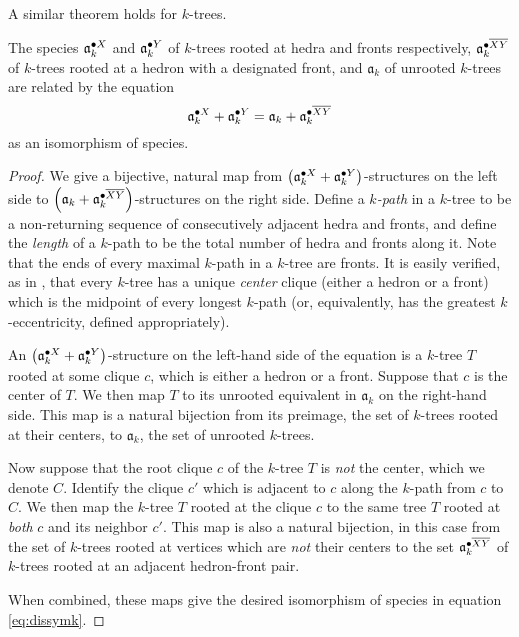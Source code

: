 \documentclass[sectionflow,singlespace,twoside,boldmathhdr,draft]{brandiss} %
\numberwithin{section}{chapter}
\numberwithin{figure}{chapter}
\begin{document}
A similar theorem holds for $k$-trees.
\begin{theorem}
  \label{thm:dissymk}
  The species $\pointed[X]{\mathfrak{a}}_{k}$ and $\pointed[Y]{\mathfrak{a}}_{k}$ of $k$-trees rooted at hedra and fronts respectively, $\pointed[\overline{XY}]{\mathfrak{a}}_{k}$ of $k$-trees rooted at a hedron with a designated front, and $\mathfrak{a}_{k}$ of unrooted $k$-trees are related by the equation
  \begin{equation}
    \label{eq:dissymk}
    \pointed[X]{\mathfrak{a}}_{k} + \pointed[Y]{\mathfrak{a}}_{k} = \mathfrak{a}_{k} + \pointed[\overline{XY}]{\mathfrak{a}}_{k}
  \end{equation}
  as an isomorphism of species.
\end{theorem}

\begin{proof}
  We give a bijective, natural map from $\pbrac{\pointed[X]{\mathfrak{a}}_{k} + \pointed[Y]{\mathfrak{a}}_{k}}$-structures on the left side to $\pbrac{\mathfrak{a}_{k} + \pointed[\overline{XY}]{\mathfrak{a}}_{k}}$-structures on the right side.
  Define a \emph{$k$-path} in a $k$-tree to be a non-returning sequence of consecutively adjacent hedra and fronts, and define the \emph{length} of a $k$-path to be the total number of hedra and fronts along it.
  Note that the ends of every maximal $k$-path in a $k$-tree are fronts.
  It is easily verified, as in \cite{kob:ktlogspace}, that every $k$-tree has a unique \emph{center} clique (either a hedron or a front) which is the midpoint of every longest $k$-path (or, equivalently, has the greatest $k$-eccentricity, defined appropriately).
  
  An $\pbrac{\pointed[X]{\mathfrak{a}}_{k} + \pointed[Y]{\mathfrak{a}}_{k}}$-structure on the left-hand side of the equation is a $k$-tree $T$ rooted at some clique $c$, which is either a hedron or a front.
  Suppose that $c$ is the center of $T$.
  We then map $T$ to its unrooted equivalent in $\mathfrak{a}_{k}$ on the right-hand side.
  This map is a natural bijection from its preimage, the set of $k$-trees rooted at their centers, to $\mathfrak{a}_{k}$, the set of unrooted $k$-trees.

  Now suppose that the root clique $c$ of the $k$-tree $T$ is \emph{not} the center, which we denote $C$.
  Identify the clique $c'$ which is adjacent to $c$ along the $k$-path from $c$ to $C$.
  We then map the $k$-tree $T$ rooted at the clique $c$ to the same tree $T$ rooted at \emph{both} $c$ and its neighbor $c'$.
  This map is also a natural bijection, in this case from the set of $k$-trees rooted at vertices which are \emph{not} their centers to the set $\pointed[\overline{XY}]{\mathfrak{a}}_{k}$ of $k$-trees rooted at an adjacent hedron-front pair.

  When combined, these maps give the desired isomorphism of species in equation \eqref{eq:dissymk}.
\end{proof}
\end{document}
